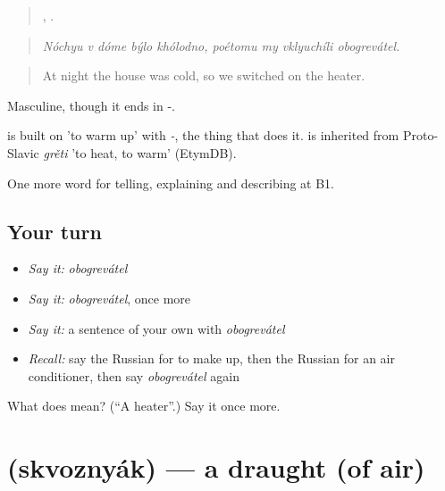 \begin{quote}
    ,    .
\end{quote}

\begin{quote}
\emph{Nóchyu v dóme býlo khólodno, poétomu my vklyuchíli obogrevátel.}
\end{quote}

\begin{quote}
At night the house was cold, so we switched on the heater.
\end{quote}

Masculine, though it ends in -.

\begin{cousinweb}
\emph{} is built on \emph{} 'to warm up' with \emph{-}, the thing that does it. \emph{} is inherited from Proto-Slavic \emph{grěti} 'to heat, to warm' (EtymDB).
\end{cousinweb}

\begin{grammarlens}[title={What you've built}]
One more word for telling, explaining and describing at B1.
\end{grammarlens}

\subsection*{Your turn}
\begin{itemize}
\raggedright
  \item \emph{Say it:} \emph{obogrevátel}
  \item \emph{Say it:} \emph{obogrevátel}, once more
  \item \emph{Say it:} a sentence of your own with \emph{obogrevátel}
  \item \emph{Recall:} say the Russian for to make up, then the Russian for an air conditioner, then say \emph{obogrevátel} again
\end{itemize}

\begin{tcolorbox}[breakable,colback=teal!4,colframe=teal!35!black,title={Before you move on}]
What does  mean? (\textquotedblleft{}A heater\textquotedblright{}.) Say it once more.
\end{tcolorbox}
\section[\texorpdfstring{\ru{сквозняк} (skvoznyák)}{сквозняк (skvoznyák)}]{ (skvoznyák) — a draught (of air)}


